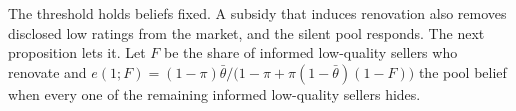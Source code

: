The threshold holds beliefs fixed. A subsidy that induces renovation also removes disclosed low ratings from the market, and the silent pool responds. The next proposition lets it. Let $F$ be the share of informed low-quality sellers who renovate and $e(1;F)=(1-\pi)\bar\theta/\big(1-\pi+\pi(1-\bar\theta)(1-F)\big)$ the pool belief when every one of the remaining informed low-quality sellers hides.
